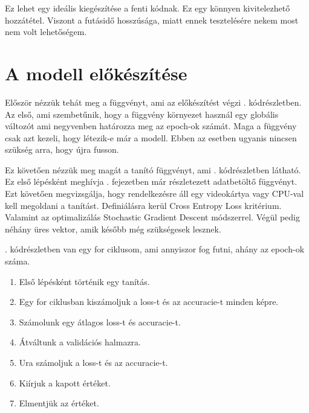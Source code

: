 \documentclass[twoside,a4paper]{refart}
\begin{document}
	Ez lehet egy ideális kiegészítése a fenti kódnak. Ez egy könnyen kivitelezhető hozzátétel. Viszont a futásidő hosszúsága, miatt ennek tesztelésére nekem most nem volt lehetőségem.
	
\section{A modell előkészítése}  

	Először nézzük tehát meg a függvényt, ami az előkészítést végzi . kódrészletben. Az első, ami szembetűnik, hogy a függvény környezet használ egy globális változót ami negyvenben határozza meg az epoch-ok számát. Maga a függvény csak azt kezeli, hogy létezik-e már a modell. Ebben az esetben ugyanis nincsen szükség arra, hogy újra fusson.
	
	{\small }
	
	Ez követően nézzük meg magát a tanító függvényt, ami . kódrészletben látható. Ez első lépésként meghívja . fejezetben már részletezett adatbetöltő függvényt. Ezt követően megvizsgálja, hogy rendelkezésre áll egy videokártya vagy CPU-val kell megoldani a tanítást. Definiálásra kerül Cross Entropy Loss kritérium\cite{CrossEntropyLoss}. Valamint az optimalizálás Stochastic Gradient Descent módszerrel\cite{sutskever2013importance}. Végül pedig néhány üres vektor, amik később még szükségesek lesznek. 
	
	{\small }
	
	. kódrészletben van egy for ciklusom, ami annyiszor fog futni, ahány az epoch-ok száma. 
	\begin{enumerate}
		\item Első lépésként történik egy tanítás.
		\item Egy for ciklusban kiszámoljuk a loss-t és az accuracie-t minden képre.
		\item Számolunk egy átlagos loss-t és accuracie-t.
		\item Átváltunk a validációs halmazra.
		\item Ura számoljuk a loss-t és az accuracie-t.
		\item Kiírjuk a kapott értéket.
		\item Elmentjük az értéket.
	\end{enumerate}
	
\end{document}
